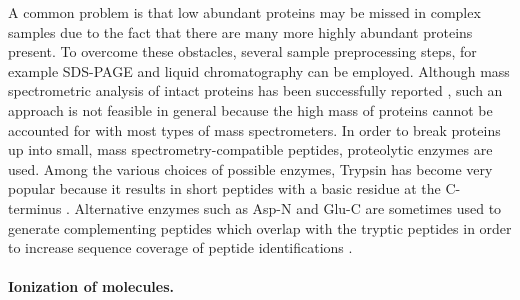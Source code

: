 
A common problem is that low abundant proteins may be missed in complex samples 
due to the fact that there are many more highly abundant proteins present.
To overcome these obstacles, several sample preprocessing steps, for example 
SDS-PAGE and liquid chromatography can be employed.
Although mass spectrometric analysis of intact proteins has been successfully
reported \citep{Lee2002, Taylor2003}, such an approach is not feasible in 
general because the high mass of proteins cannot be accounted for with most
types of mass spectrometers.
In order to break proteins up into small, mass spectrometry-compatible peptides, 
proteolytic enzymes are used.
Among the various choices of possible enzymes, Trypsin has become very popular
because it results in short peptides with a basic residue at the C-terminus
\citep{Olsen2004}.
Alternative enzymes such as Asp-N and Glu-C are sometimes used to generate
complementing peptides which overlap with the tryptic peptides in order to 
increase sequence coverage of peptide identifications \citep{Steen2004}.

% 

\paragraph{Ionization of molecules.}

